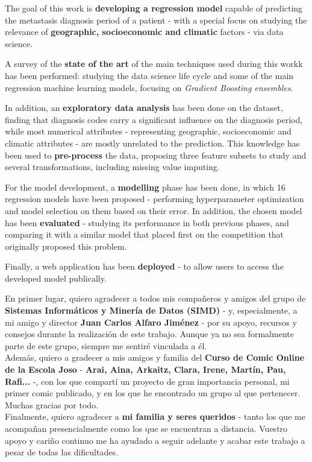 The goal of this work is \textbf{developing a regression model} capable of predicting the metastasis diagnosis period of a patient - with a special focus on studying the relevance of \textbf{geographic, socioeconomic and climatic} factors - via data science.

A survey of the \textbf{state of the art} of the main techniques used during this workk has been performed: studying the data science life cycle and some of the main regression machine learning models, focusing on \textit{Gradient Boosting ensembles}.

In addition, an \textbf{exploratory data analysis} has been done on the dataset, finding that diagnosis codes carry a significant influence on the diagnosis period, while most numerical attributes - representing geographic, socioeconomic and climatic attributes - are mostly unrelated to the prediction. This knowledge has been used to \textbf{pre-process} the data, proposing three feature subsets to study and several transformations, including missing value imputing.

For the model development, a \textbf{modelling} phase has been done, in which 16 regression models have been proposed - performing hyperparameter optimization and model selection on them based on their error. In addition, the chosen model has been \textbf{evaluated} - studying its performance in both previous phases, and comparing it with a similar model that placed first on the competition that originally proposed this problem.

Finally, a web application has been \textbf{deployed} - to allow users to access the developed model publically.
\cleardoublepage
\thispagestyle{plain}
\begin{center}
\Large{}
\end{center}
\vskip1cm

En primer lugar, quiero agradecer a todos mis compañeros y amigos del grupo de \textbf{Sistemas Informáticos y Minería de Datos (SIMD)} - y, especialmente, a mi amigo y director \textbf{Juan Carlos Alfaro Jiménez} - por su apoyo, recursos y consejos durante la realización de este trabajo. Aunque ya no sea formalmente parte de este grupo, siempre me sentiré vinculada a él.\\

Además, quiero a gradecer a mis amigos y familia del \textbf{Curso de Comic Online de la Escola Joso} - \textbf{Arai, Aina, Arkaitz, Clara, Irene, Martín, Pau, Rafi...} -, con los que compartí un proyecto de gran importancia personal, mi primer comic publicado, y en los que he encontrado un grupo al que pertenecer. Muchas gracias por todo.\\

Finalmente, quiero agradecer a \textbf{mi familia y seres queridos} - tanto los que me acompañan presencialmente como los que se encuentran a distancia. Vuestro apoyo y cariño continuo me ha ayudado a seguir adelante y acabar este trabajo a pesar de todas las dificultades.